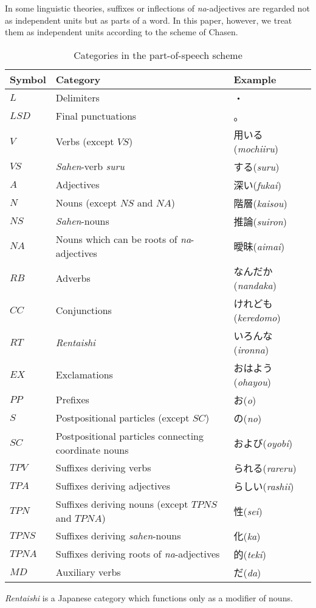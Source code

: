 In some linguistic theories, suffixes or inflections of {\it na}-adjectives are regarded not as independent units but as parts of a word. In this paper, however, we treat them as independent units according to the scheme of Chasen.

\begin{table*}
\begin{center}
{\small
\begin{tabular}{|l|l|l|}
\hline
Symbol & Category & Example\\
\hline
\hline
\underline{$L$} & Delimiters & ・\\
$LSD$ & Final punctuations & 。\\
\hline
\underline{$V$} & Verbs (except $VS$) & 用いる({\it mochiiru})\\
\underline{$VS$} & {\it Sahen}-verb {\it suru} & する({\it suru})\\
\hline
\underline{$A$} & Adjectives & 深い({\it fukai})\\
\hline
\underline{$N$} & Nouns (except $NS$ and $NA$) & 階層({\it kaisou})\\
\underline{$NS$} & {\it Sahen}-nouns & 推論({\it suiron})\\
\underline{$NA$} & Nouns which can be roots of {\it na}-adjectives & 曖昧({\it aimai})\\
\hline
\underline{$RB$} & Adverbs & なんだか({\it nandaka})\\
\hline
$CC$ & Conjunctions & けれども({\it keredomo})\\
\hline
$RT$ & {\it Rentaishi} & いろんな({\it ironna})\\
\hline
$EX$ & Exclamations & おはよう({\it ohayou})\\
\hline
$PP$ & Prefixes & お({\it o})\\
\hline
\underline{$S$} & Postpositional particles (except $SC$) & の({\it no})\\
\underline{$SC$} & Postpositional particles connecting coordinate nouns & および({\it oyobi})\\
\hline
\underline{$TPV$} & Suffixes deriving verbs & られる({\it rareru})\\
\underline{$TPA$} & Suffixes deriving adjectives & らしい({\it rashii})\\
\underline{$TPN$} & Suffixes deriving nouns (except $TPNS$ and $TPNA$) & 性({\it sei})\\
\underline{$TPNS$} & Suffixes deriving {\it sahen}-nouns & 化({\it ka})\\
\underline{$TPNA$} & Suffixes deriving roots of {\it na}-adjectives & 的({\it teki})\\
\hline
\underline{$MD$} & Auxiliary verbs & だ({\it da})\\
\hline
\end{tabular}
}
\begin{center}
\scriptsize{{\it Rentaishi} is a Japanese category which functions only as a modifier of nouns.\\}
\end{center}

\end{center}
\caption{Categories in the part-of-speech scheme}
\end{table*}

